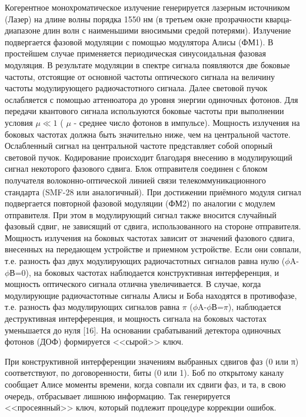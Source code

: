 Когерентное монохроматическое излучение генерируется лазерным источником (Лазер) на длине волны порядка 1550 нм (в третьем окне прозрачности кварца-диапазоне длин волн с наименьшими вносимыми средой потерями). Излучение подвергается фазовой модуляции с помощью модулятора Алисы (ФМ1). В простейшем случае применяется периодическая синусоидальная фазовая модуляция. В результате модуляции в спектре сигнала появляются две боковые частоты, отстоящие от основной частоты оптического сигнала на величину частоты модулирующего радиочастотного сигнала. Далее световой пучок ослабляется с помощью аттенюатора до уровня энергии одиночных фотонов. Для передачи квантового сигнала используются боковые частоты при выполнении условия $\mu \ll 1$ ( $\mu$ - среднее число фотонов в импульсе). Мощность излучения на боковых частотах должна быть значительно ниже, чем на центральной частоте. Ослабленный сигнал на центральной частоте представляет собой опорный световой пучок. Кодирование происходит благодаря внесению в модулирующий сигнал некоторого фазового сдвига. Блок отправителя соединен с блоком получателя волоконно-оптической линией связи телекоммуникационного стандарта (SMF-28 или аналогичный). При достижении приёмного модуля сигнал подвергается повторной фазовой модуляции (ФМ2) по аналогии с модулем отправителя. При этом в модулирующий сигнал также вносится случайный фазовый сдвиг, не зависящий от сдвига, использованного на стороне отправителя. Мощность излучения на боковых частотах зависит от значений фазового сдвига, внесенных на передающем устройстве и приемном устройстве. Если они совпали, т.\:е. разность фаз двух модулирующих радиочастотных сигналов равна нулю ($\phi$A-$\phi$В=$0$), на боковых частотах наблюдается конструктивная интерференция, и мощность оптического сигнала отлична увеличивается. В случае, когда модулирующие радиочастотные сигналы Алисы и Боба находятся в противофазе, т.\:е. разность фаз модулирующих сигналов равна $\pi$ ($\phi$A-$\phi$В=$\pi$), наблюдается деструктивная интерференция, и мощность сигнала на боковых частотах уменьшается до нуля [16]. На основании срабатываний детектора одиночных фотонов (ДОФ) формируется <<сырой>> ключ.
 
 
При конструктивной интерференции значениям выбранных сдвигов фаз (0 или π) соответствуют, по договоренности, биты (0 или 1). Боб по открытому каналу сообщает Алисе моменты времени, когда совпали их сдвиги фаз, и та, в свою очередь, отбрасывает лишнюю информацию. Так генерируется <<просеянный>> ключ, который подлежит процедуре коррекции ошибок. 

